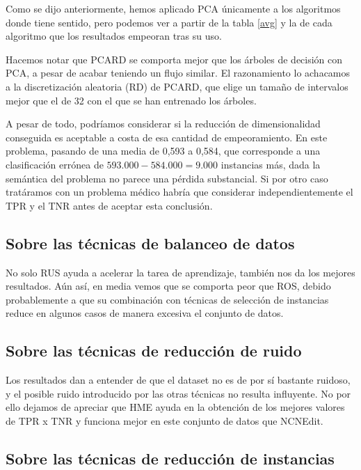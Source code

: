 Como se dijo anteriormente, hemos aplicado PCA únicamente a los algoritmos donde tiene sentido, pero podemos ver a partir de la tabla \ref{avg} y la de cada algoritmo que los resultados empeoran tras su uso.

\vspace{\baselineskip}

Hacemos notar que PCARD se comporta mejor que los árboles de decisión con PCA, a pesar de acabar teniendo un flujo similar. El razonamiento lo achacamos a la discretización aleatoria (RD) de PCARD, que elige un tamaño de intervalos mejor que el de 32 con el que se han entrenado los árboles.

\vspace{\baselineskip}

A pesar de todo, podríamos considerar si la reducción de dimensionalidad conseguida es aceptable a costa de esa cantidad de empeoramiento. En este problema, pasando de una media de 0,593 a 0,584, que corresponde a una clasificación errónea de $593.000 - 584.000 = 9.000$ instancias más, dada la semántica del problema no parece una pérdida substancial. Si por otro caso tratáramos con un problema médico habría que considerar independientemente el TPR y el TNR antes de aceptar esta conclusión.

\subsection{Sobre las técnicas de balanceo de datos}

No solo RUS ayuda a acelerar la tarea de aprendizaje, también nos da los mejores resultados. Aún así, en media vemos que se comporta peor que ROS, debido probablemente a que su combinación con técnicas de selección de instancias reduce en algunos casos de manera excesiva el conjunto de datos.

\subsection{Sobre las técnicas de reducción de ruido}

Los resultados dan a entender de que el dataset no es de por sí bastante ruidoso, y el posible ruido introducido por las otras técnicas no resulta influyente. No por ello dejamos de apreciar que HME ayuda en la obtención de los mejores valores de TPR x TNR y funciona mejor en este conjunto de datos que NCNEdit.

\subsection{Sobre las técnicas de reducción de instancias}


